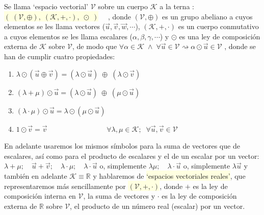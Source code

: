 \begin{defi} Se llama `espacio vectorial' $\mathcal V$ sobre un cuerpo $\mathcal K$ a la terna : $\; \; $ \colorbox{LightYellow}{$\displaystyle \left( \; (\mathcal V, \oplus),\; (\mathcal K,+,\cdot),\; \odot \;  \right) $} $\quad$, donde $(\mathcal V, \oplus)$ es un grupo abeliano a cuyos elementos se les llama vectores ($\vec u, \vec v, \vec w, \cdots  $), $(\mathcal K, +, \cdot)$ es un cuerpo conmutativo a cuyos elementos se les llama escalares ($\alpha, \beta, \gamma, \cdots$) y $\odot$ es una ley de composición externa de $\mathcal K$ sobre $\mathcal V$, de modo que $\forall \alpha \in \mathcal K \; \wedge \; \forall \vec u \in \mathcal V \rightsquigarrow \alpha \odot \vec u \in \mathcal V$ , donde se han de cumplir cuatro propiedades:

\begin{enumerate}[EV.1. ]

\item $\lambda \odot (\vec u \oplus \vec v)= (\lambda \odot \vec u) \; \oplus \; (\lambda \odot \vec v)$
\item $(\lambda + \mu)\odot \vec u = (\lambda \odot \vec u) \; \oplus \; (\mu \odot \vec u)$
\item  $(\lambda \cdot \mu)\odot \vec u = \lambda \odot (\mu \odot \vec u)$
\item $1\odot \vec v = \vec v$
$\qquad \qquad \qquad \qquad \forall \lambda, \mu \in \mathcal K; \; \; \forall \vec u, \vec v \in \mathcal V$	
\end{enumerate}
\end{defi}

En adelante usaremos los mismos símbolos para la suma de vectores que de escalares, así como para el producto de escalares y el de un escalar por un vector: $\lambda + \mu; \quad \vec u + \vec v; \quad \lambda \cdot \mu; \quad \lambda \cdot \vec u$ o, simplemente $\lambda \mu; \quad \lambda \cdot \vec u$ o, simplemente $\lambda \vec u$ y también en adelante $\mathcal K \equiv \mathbb R$ y hablaremos de \colorbox{LightYellow}{`espacios vectoriales reales'}, que representaremos más sencillamente por \colorbox{LightYellow}{$(\mathcal V, +, \cdot)$},  donde $+$ es la ley de composición interna en $\mathcal V$, la suma de vectores y $\cdot$  es la ley de composición externa de $\mathbb R$ sobre $\mathcal V$, el producto de un número real (escalar) por un vector.

